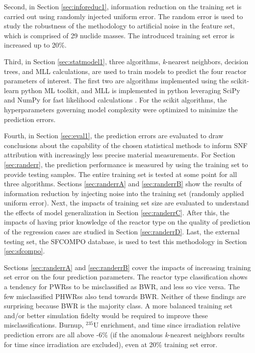 Second, in Section \ref{sec:inforeduc1}, information reduction on the training
set is carried out using randomly injected uniform error. The random error is
used to study the robustness of the methodology to artificial noise in the
feature set, which is comprised of 29 nuclide masses.  The introduced training
set error is increased up to 20\%.

Third, in Section \ref{sec:statmodel1}, three algorithms, \textit{k}-nearest
neighbors, decision trees, and \gls{MLL} calculations, are used to train models
to predict the four reactor parameters of interest.  The first two are
algorithms implemented using the scikit-learn python \gls{ML} toolkit, and
\gls{MLL} is implemented in python leveraging SciPy and NumPy for fast
likelihood calculations \cite{scikit, scipy, numpy}.  For the scikit
algorithms, the hyperparameters governing model complexity were optimized to
minimize the prediction errors.  

Fourth, in Section \ref{sec:eval1}, the prediction errors are evaluated to draw
conclusions about the capability of the chosen statistical methods to inform
\gls{SNF} attribution with increasingly less precise material measurements.
For Section \ref{sec:randerr}, the prediction performance is measured by using
the training set to provide testing samples. The entire training set is tested
at some point for all three algorithms.  Sections \ref{sec:randerrA} and
\ref{sec:randerrB} show the results of information reduction by injecting noise
into the training set (randomly applied uniform error).  Next, the impacts of
training set size are evaluated to understand the effects of model
generalization in Section \ref{sec:randerrC}. After this, the impacts of having
prior knowledge of the reactor type on the quality of prediction of the
regression cases are studied in Section \ref{sec:randerrD}.  Last, the external
testing set, the \gls{SFCOMPO} database, is used to test this methodology in
Section \ref{sec:sfcompo}. 

Sections \ref{sec:randerrA} and \ref{sec:randerrB} cover the impacts of
increasing training set error on the four prediction parameters.  The reactor
type classification shows a tendency for \glspl{PWR}s to be misclassified as
\gls{BWR}, and less so vice versa. The few misclassified \glspl{PHWR}s also
tend towards \gls{BWR}. Neither of these findings are surprising because
\gls{BWR} is the majority class. A more balanced training set and/or better
simulation fidelty would be required to improve these misclassifications.
Burnup, ${}^{235}\text{U}$ enrichment, and time since irradiation relative
prediction errors are all above -6\% (if the anomalous \textit{k}-nearest
neighbors results for time since irradiation are excluded), even at 20\%
training set error.

